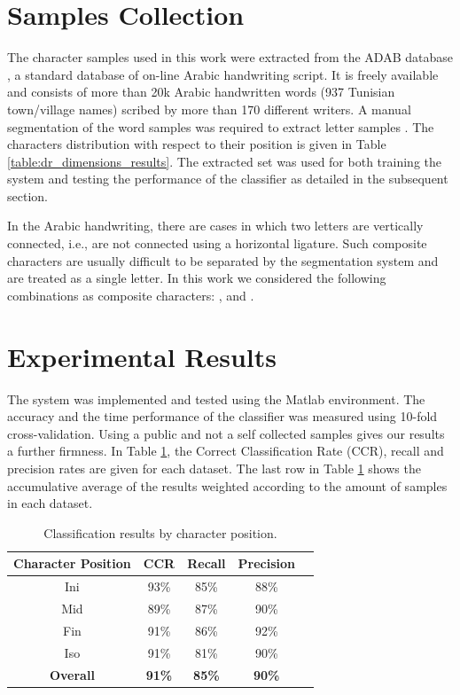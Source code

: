 \documentclass[10pt, conference, compsocconf]{IEEEtran}
\begin{document}
\section{Samples Collection}
\label{sec:samples_collection}
The character samples used in this work were extracted from the ADAB database \cite{el2009icdar}, a standard database of on-line Arabic handwriting script. 
It is freely available and consists of more than 20k Arabic handwritten words (937 Tunisian town/village names) scribed by more than 170 different writers. 
A manual segmentation of the word samples was required to extract letter samples \cite{kour2014real}.
The characters distribution with respect to their position is given in Table \ref{table:dr_dimensions_results}.
The extracted set was used for both training the system and testing the performance of the classifier as detailed in the subsequent section.

In the Arabic handwriting, there are cases in which two letters are vertically connected, i.e., are not connected using a horizontal ligature.  
Such composite characters are usually difficult to be separated by the segmentation system and are treated as a single letter.
In this work we considered the following combinations as composite characters:  ,  and .

\section{Experimental Results}
\label{sec:experimental_results}

The system was implemented and tested using the Matlab environment.
The accuracy and the time performance of the classifier was measured using 10-fold cross-validation.
Using a public and not a self collected samples gives our results a further firmness.
In Table \ref{table:results_position}, the Correct Classification Rate (CCR), recall and precision rates are given for each dataset.
The last row in Table \ref{table:results_position} shows the accumulative average of the results weighted according to the amount of samples in each dataset.

\begin{table}
\centering
\renewcommand{\arraystretch}{1.2}
\begin{tabular}{ | c | c | c | c | c |}
\hline
	\textbf{Character Position} & \textbf{CCR} & \textbf{Recall} &  \textbf{Precision} \\
	\hline 
	Ini & 93\% & 85\% & 88\% \\                
  	\hline
  	Mid & 89\% & 87\% & 90\% \\
  	\hline
  	Fin & 91\% &  86\% & 92\% \\
  	\hline
  	Iso & 91\% &  81\% & 90\% \\
  	\hline
  	\textbf{Overall} & \textbf{91\%} &  \textbf{85\%} & \textbf{90\%} \\
  	\hline
\end{tabular}
\caption{Classification results by character position.}
\label{table:results_position} 
\end{table}
\end{document}

